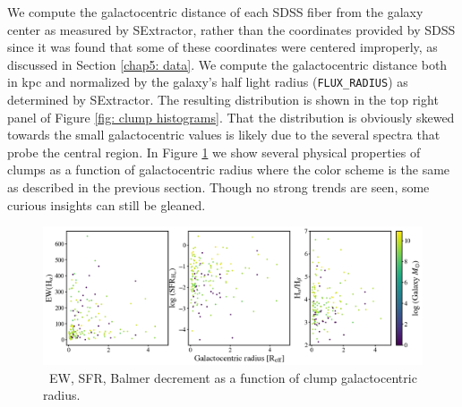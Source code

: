 We compute the galactocentric distance of each SDSS fiber from the galaxy center as measured by SExtractor, rather than the coordinates provided by SDSS since it was found  that some of these coordinates were centered improperly, as discussed in Section \ref{chap5: data}. We compute the galactocentric distance both in kpc and normalized by the galaxy's half light radius (\texttt{FLUX\_RADIUS}) as determined by SExtractor. The resulting distribution is shown in the top right panel of Figure \ref{fig: clump histograms}. That the distribution is obviously skewed towards the small galactocentric values is likely due to the several spectra that probe the central region. In Figure \ref{fig: galactocentric radius relations} we show several physical properties of clumps as a function of galactocentric radius where the color scheme is the same as described in the previous section. Though no strong trends are seen, some curious insights can still be gleaned.
  

\begin{figure}
\includegraphics[width=\textwidth]{Figures/clump_galactocentric_Reff.png}
\caption[\ha~EW, SFR, Balmer decrement as a function of clump galactocentric radius.]{\ha~EW, SFR, Balmer decrement as a function of clump galactocentric radius.}
\label{fig: galactocentric radius relations}
\end{figure}


